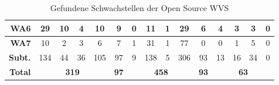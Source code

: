 \documentclass[12pt,oneside,a4paper,parskip,pointlessnumbers]{scrbook}
\begin{document}
\begin{table}[H]
\begin{tabular}{|r|c|c|c|c|c|c|c|c|c|c|c|c|c|c|}
        \hline
        \textbf{WA6}      & 29   & 10   & 4   & 10                & 9              & 0    & 11   & 1   & 29                & 6               & 4    & 3    & 3   & 0                           \\
        \hline
        \textbf{WA7}    & 10   & 2    & 3   & 6                 & 7              & 1    & 31   & 1   & 77                & 0               & 0    & 1    & 5   & 0                           \\
        \hline
        \textbf{Subt.}           & 134  & 44   & 36  & 105               & 97             & 9    & 138  & 5   & 306               & 93              & 13   & 16   & 34  & 0                           \\
        \hline
        \textbf{Total}              & \multicolumn{4}{c|}{\textbf{319}}     & \textbf{97}    & \multicolumn{4}{c|}{\textbf{458}}     & \textbf{93}     & \multicolumn{4}{c|}{\textbf{63}}                \\
        \hline
      \end{tabular}
      \caption[Gefundene Schwachstellen der Open Source WVS]{Gefundene Schwachstellen der Open Source WVS}
    \end{table}
    \vspace{20pt}
\end{document}
